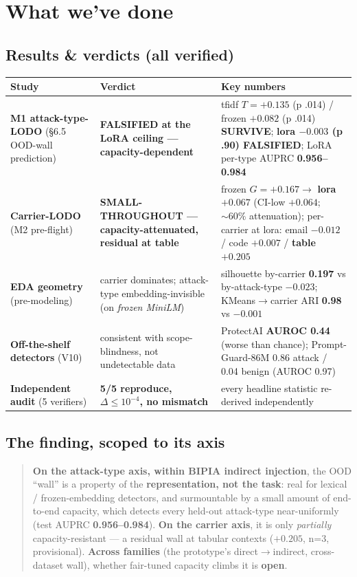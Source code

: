 \documentclass[11pt,parskip=half-]{scrartcl}
\newcommand{\arr}{\ensuremath{\rightarrow}}
\begin{document}
\section{What we've done}

\subsection{Results \& verdicts (all verified)}

\begin{center}\small
\begin{tabularx}{\linewidth}{@{}l Y Y@{}}
\toprule
\textbf{Study} & \textbf{Verdict} & \textbf{Key numbers} \\
\midrule
\textbf{M1 attack-type-LODO} (\S6.5 OOD-wall prediction) &
  \textbf{FALSIFIED at the LoRA ceiling --- capacity-dependent} &
  tfidf $T={+}0.135$ (p .014) / frozen ${+}0.082$ (p .014) \textbf{SURVIVE}; \textbf{lora $-0.003$
  (p .90) FALSIFIED}; LoRA per-type AUPRC \textbf{0.956--0.984} \\[5pt]
\textbf{Carrier-LODO} (M2 pre-flight) &
  \textbf{SMALL-THROUGHOUT --- capacity-attenuated, residual at table} &
  frozen $G={+}0.167 \arr$ \textbf{lora ${+}0.067$} (CI-low ${+}0.064$; ${\sim}60\%$ attenuation);
  per-carrier at lora: email $-0.012$ / code ${+}0.007$ / \textbf{table ${+}0.205$} \\[5pt]
\textbf{EDA geometry} (pre-modeling) &
  carrier dominates; attack-type embedding-invisible (on \emph{frozen MiniLM}) &
  silhouette by-carrier \textbf{0.197} vs by-attack-type $-0.023$; KMeans\arr carrier ARI \textbf{0.98}
  vs $-0.001$ \\[5pt]
\textbf{Off-the-shelf detectors} (V10) &
  consistent with scope-blindness, not undetectable data &
  ProtectAI \textbf{AUROC 0.44} (worse than chance); Prompt-Guard-86M 0.86 attack / 0.04 benign
  (AUROC 0.97) \\[5pt]
\textbf{Independent audit} (5 verifiers) &
  \textbf{5/5 reproduce, $\Delta \le 10^{-4}$, no mismatch} &
  every headline statistic re-derived independently \\
\bottomrule
\end{tabularx}
\end{center}

\subsection{The finding, scoped to its axis}

\begin{quote}
\textbf{On the attack-type axis, within BIPIA indirect injection}, the OOD ``wall'' is a property of the
\textbf{representation, not the task}: real for lexical / frozen-embedding detectors, and surmountable by
a small amount of end-to-end capacity, which detects every held-out attack-type near-uniformly (test
AUPRC \textbf{0.956--0.984}). \textbf{On the carrier axis}, it is only \emph{partially}
capacity-resistant --- a residual wall at tabular contexts ($+0.205$, n=3, provisional).
\textbf{Across families} (the prototype's direct\arr indirect, cross-dataset wall), whether fair-tuned
capacity climbs it is \textbf{open}.
\end{quote}
\end{document}
